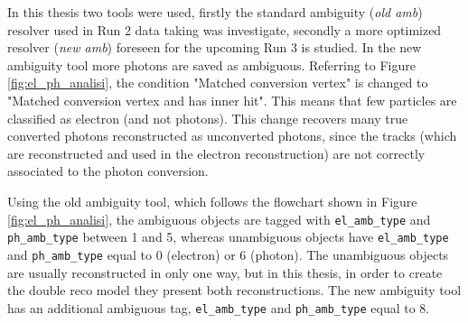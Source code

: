\documentclass[a4paper, oneside, 11pt, openright]{book}
\begin{document}
		In this thesis two tools were used, firstly the standard ambiguity (\textit{old amb}) resolver used in Run 2 data taking was investigate, secondly a more optimized resolver (\textit{new amb}) foreseen for the upcoming Run 3 is studied. In the new ambiguity tool more photons are saved as ambiguous. Referring to Figure \ref{fig:el_ph_analisi}, the condition "Matched conversion vertex" is changed to "Matched conversion vertex and has inner hit". This means that few particles are classified as electron (and not photons). This change recovers many true converted photons reconstructed as unconverted photons, since the tracks (which are reconstructed and used in the electron reconstruction) are not correctly associated to the photon conversion. 
		
		Using the old ambiguity tool, which follows the flowchart shown in Figure \ref{fig:el_ph_analisi}, the ambiguous objects are tagged with \texttt{el\_amb\_type} and \texttt{ph\_amb\_type} between 1 and 5, whereas unambiguous objects have \texttt{el\_amb\_type} and \texttt{ph\_amb\_type} equal to 0 (electron) or 6 (photon). The unambiguous objects are usually reconstructed in only one way, but in this thesis, in order to create the double reco model they present both reconstructions. The new ambiguity tool has an additional ambiguous tag, \texttt{el\_amb\_type} and \texttt{ph\_amb\_type} equal to 8.
		
\end{document}
